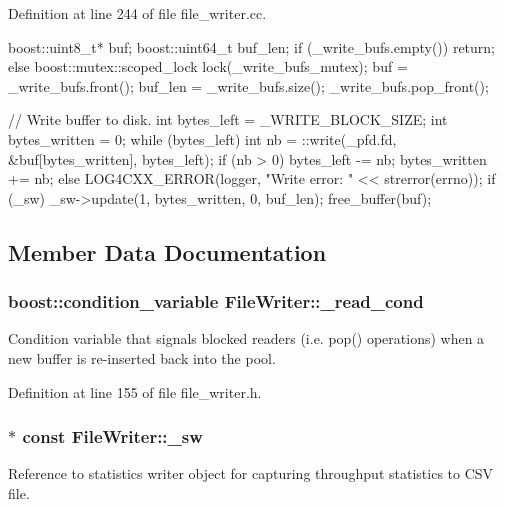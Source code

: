 Definition at line 244 of file file\_\-writer.cc.


\begin{DoxyCode}
                             {
  boost::uint8_t* buf;
  boost::uint64_t buf_len;
  if (_write_bufs.empty()) {
    return;
  } else {
    boost::mutex::scoped_lock lock(_write_bufs_mutex);
    buf = _write_bufs.front();
    buf_len = _write_bufs.size();
    _write_bufs.pop_front();
  }

  // Write buffer to disk.
  int bytes_left = _WRITE_BLOCK_SIZE;
  int bytes_written = 0;
  while (bytes_left) {
    int nb = ::write(_pfd.fd, &buf[bytes_written], bytes_left);
    if (nb > 0) {
      bytes_left -= nb;
      bytes_written += nb;
    } else {
      LOG4CXX_ERROR(logger, "Write error: " << strerror(errno));
    }
  }
  if (_sw)
    _sw->update(1, bytes_written, 0, buf_len);
  free_buffer(buf);
}
\end{DoxyCode}


\subsection{Member Data Documentation}
\hypertarget{class_file_writer_a094970dbaba07c145b26b9fce12951e8}{
\subsubsection[{\_\-read\_\-cond}]{\setlength{\rightskip}{0pt plus 5cm}boost::condition\_\-variable {\bf FileWriter::\_\-read\_\-cond}}}
\label{class_file_writer_a094970dbaba07c145b26b9fce12951e8}
Condition variable that signals blocked readers (i.e. pop() operations) when a new buffer is re-\/inserted back into the pool. 

Definition at line 155 of file file\_\-writer.h.

\hypertarget{class_file_writer_a77bde646bee4389994613ae0663a13ca}{
\subsubsection[{\_\-sw}]{$\ast$ const {\bf FileWriter::\_\-sw}}}
\label{class_file_writer_a77bde646bee4389994613ae0663a13ca}
Reference to statistics writer object for capturing throughput statistics to CSV file. 

